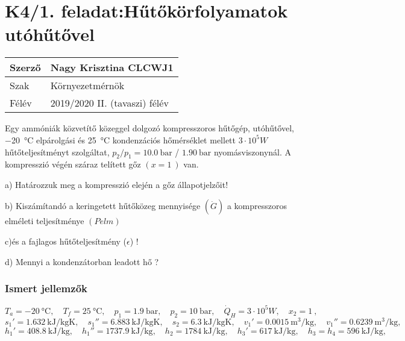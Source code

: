 


\section*{K4/1. feladat:Hűtőkörfolyamatok utóhűtővel}

\begin{tabular}{ | p{2cm} | p{14cm} | } 
	\hline
	Szerző & Nagy Krisztina CLCWJ1 \\ 
	\hline
	Szak & Környezetmérnök \\ 
	\hline
	Félév & 2019/2020 II. (tavaszi) félév \\ 
	\hline
\end{tabular}
\vspace{0.5cm}

\noindent Egy ammóniák közvetítő közeggel dolgozó kompresszoros hűtőgép, utóhűtővel, \SI{-20}{\celsius} elpárolgási és \SI{25}{\celsius} kondenzációs hőmérséklet mellett $3\cdot10^5 W$ hűtőteljesítményt szolgáltat, $p_2/p_1 = \SI{10,0}{\bar}$ /  $\SI{1,90}{\bar}$ nyomásviszonynál. A kompresszió végén száraz telített gőz  $(x=\SI{1}{}) $ van.

\vspace{2mm}

a) Határozzuk meg a kompresszió elején a gőz állapotjelzőit!

b) Kiszámítandó a keringetett hűtőközeg mennyisége $(\dot{G})$ a kompresszoros elméleti teljesítménye $(Pelm)$

c)és a fajlagos hűtőteljesítmény ($\epsilon$) !

d) Mennyi a kondenzátorban leadott hő ?

\subsubsection{Ismert jellemzők}
\begin{equation*}
	T_a = \SI{-20}{\celsius},
	\quad
	T_f = \SI{+25}{\celsius},
	\quad
	p_1 = \SI{1,9}{\bar},
	\quad
	p_2 = \SI{10}{\bar},
	\quad
	\dot{Q}_H = 3\cdot10^5 W,
	\quad
	x_2 = \SI{1}{},
\end{equation*}
\begin{equation*}
	s_1' = \SI{1,632}{\kilo\joule\per\kilogram\kelvin},
	\quad
	s_1'' = \SI{6,883}{\kilo\joule\per\kilogram\kelvin},
	\quad
	s_2 = \SI{6,3}{\kilo\joule\per\kilogram\kelvin},
	\quad
	v_1' = \SI{0,0015}{\meter\cubed\per\kilogram},
	\quad
	v_1'' = \SI{0,6239}{\meter\cubed\per\kilogram},
\end{equation*}
\begin{equation*}
	h_1' = \SI{408,8}{\kilo\joule\per\kilogram},
    \quad
    h_1'' = \SI{1737,9}{\kilo\joule\per\kilogram},
    \quad
	h_2 = \SI{1784}{\kilo\joule\per\kilogram},
    \quad
    h_3' = \SI{617}{\kilo\joule\per\kilogram},
    \quad
    h_3 = h_4 = \SI{596}{\kilo\joule\per\kilogram},
\end{equation*}

